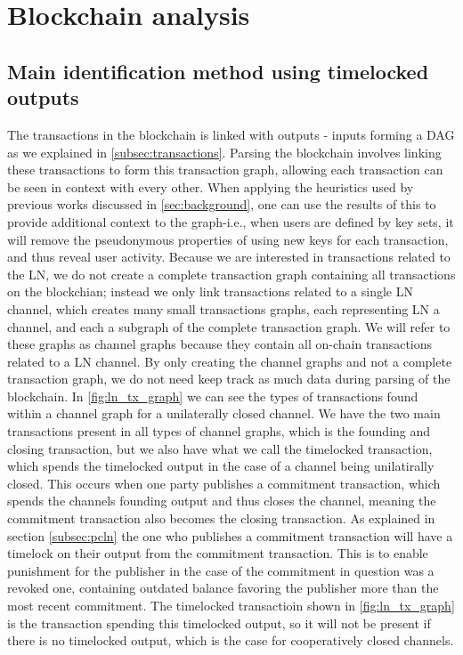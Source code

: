\section{Blockchain analysis}
\label{sec:bc_analysis}

\subsection{Main identification method using timelocked outputs}
\label{timelocked_identification}
The transactions in the blockchain is linked with outputs - inputs forming a DAG as we explained in \cref{subsec:transactions}. Parsing the blockchain involves linking these transactions to form this transaction graph, allowing each transaction can be seen in context with every other. When applying the heuristics used by previous works discussed in \cref{sec:background}, one can use the results of this to provide additional context to the graph-i.e., when users are defined by key sets, it will remove the pseudonymous properties of using new keys for each transaction, and thus reveal user activity. Because we are interested in transactions related to the LN, we do not create a complete transaction graph containing all transactions on the blockchian; instead we only link transactions related to a single LN channel, which creates many small transactions graphs, each representing LN a channel, and each a subgraph of the complete transaction graph. 
We will refer to these graphs as channel graphs because they contain all on-chain transactions related to a LN channel.
By only creating the channel graphs and not a complete transaction graph, we do not need keep track as much data during parsing of the blockchain. 
In \cref{fig:ln_tx_graph} we can see the types of transactions found within a channel graph for a unilaterally closed channel. 
We have the two main transactions present in all types of channel graphs, which is the founding and closing transaction, but we also have what we call the timelocked transaction, which spends the timelocked output in the case of a channel being unilatirally closed.
This occurs when one party publishes a commitment transaction, which spends the channels founding output and thus closes the channel, meaning the commitment transaction also becomes the closing transaction. As explained in section \cref{subsec:pcln} the one who publishes a commitment transaction will have a timelock on their output from the commitment transaction. This is to enable punishment for the publisher in the case of the commitment in question was a revoked one, containing outdated balance favoring the publisher more than the most recent commitment. 
The timelocked transactioin shown in \cref{fig:ln_tx_graph} is the transaction spending this timelocked output, so it will not be present if there is no timelocked output, which is the case for cooperatively closed channels.
\\

